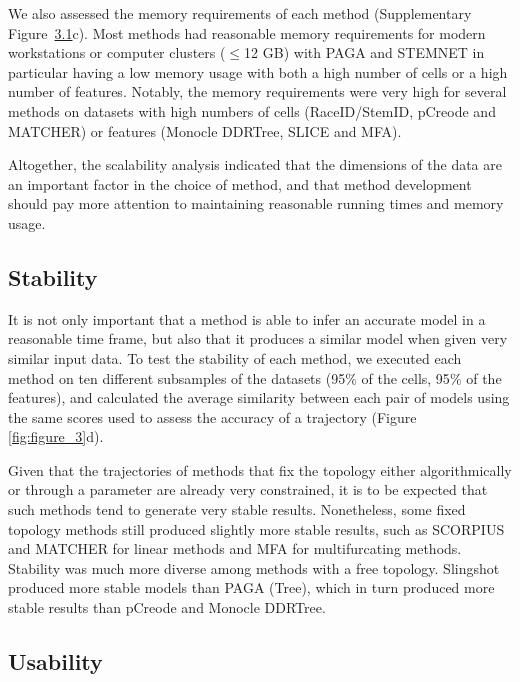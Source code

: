 We also assessed the memory requirements of each method (Supplementary Figure~\hyperref[fig:suppfig_2]{3.1}c). Most methods had reasonable memory requirements for modern workstations or computer clusters ($\leq$12 GB) with PAGA and STEMNET in particular having a low memory usage with both a high number of cells or a high number of features. Notably, the memory requirements were very high for several methods on datasets with high numbers of cells (RaceID/StemID, pCreode and MATCHER) or features (Monocle DDRTree, SLICE and MFA).

Altogether, the scalability analysis indicated that the dimensions of the data are an important factor in the choice of method, and that method development should pay more attention to maintaining reasonable running times and memory usage.

\subsection{Stability}

It is not only important that a method is able to infer an accurate model in a reasonable time frame, but also that it produces a similar model when given very similar input data. To test the stability of each method, we executed each method on ten different subsamples of the datasets (95$\%$ of the cells, 95$\%$ of the features), and calculated the average similarity between each pair of models using the same scores used to assess the accuracy of a trajectory (Figure \ref{fig:figure_3}d).

Given that the trajectories of methods that fix the topology either algorithmically or through a parameter are already very constrained, it is to be expected that such methods tend to generate very stable results. Nonetheless, some fixed topology methods still produced slightly more stable results, such as SCORPIUS and MATCHER for linear methods and MFA for multifurcating methods. Stability was much more diverse among methods with a free topology. Slingshot produced more stable models than PAGA (Tree), which in turn produced more stable results than pCreode and Monocle DDRTree.

\subsection{Usability}

